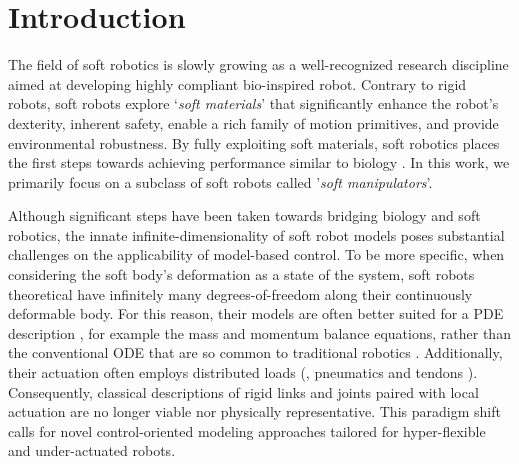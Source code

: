 \section{Introduction} \label{sec:chap3_introduction}
The field of soft robotics is slowly growing as a well-recognized research discipline aimed at developing highly compliant bio-inspired robot. Contrary to rigid robots, soft robots explore `\textit{soft materials}' that significantly enhance the robot's dexterity, inherent safety, enable a rich family of motion primitives, and provide environmental robustness. By fully exploiting soft materials, soft robotics places the first steps towards achieving performance similar to biology \cite{Choi2011,Falkenhahn2015,Marchese2014}. In this work, we primarily focus on a subclass of soft robots called '\textit{soft manipulators}'.

Although significant steps have been taken towards bridging biology and soft robotics, the innate infinite-dimensionality of soft robot models poses substantial challenges on the applicability of model-based control. To be more specific, when considering the soft body's deformation as a state of the system, soft robots theoretical have infinitely many degrees-of-freedom along their continuously deformable body. For this reason, their models are often better suited for a PDE description \cite{Duriez2013,Largilliere2015,Wu2021}, for example the mass and momentum balance equations, rather than the conventional ODE that are so common to traditional robotics \cite{Spong2006,Murray1994}. Additionally, their actuation often employs distributed loads (\eg, pneumatics \cite{Falkenhahn2015,Marchese2014} and tendons \cite{Till2019,Wu2021}). Consequently, classical descriptions of rigid links and joints paired with local actuation are no longer viable nor physically representative. This paradigm shift calls for novel control-oriented modeling approaches tailored for hyper-flexible and under-actuated robots.


